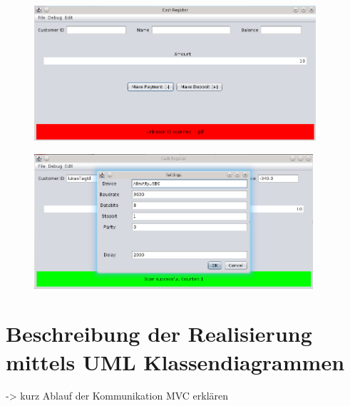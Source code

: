 \documentclass[11pt]{article} %
\begin{document}
\begin{figure}[htb] \centering
\includegraphics[height=5cm,keepaspectratio]{snapshot4.png}
\caption{}
\end{figure}

\begin{figure}[htb] \centering
\includegraphics[height=5cm,keepaspectratio]{snapshot5.png}
\caption{}
\end{figure}


\section{Beschreibung der Realisierung mittels UML Klassendiagrammen}
-> kurz Ablauf der Kommunikation MVC erklären
\end{document}
